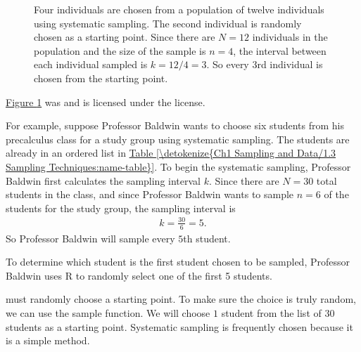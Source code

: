 \documentclass[letterpaper,10pt,english]{jupyterBook}
\begin{document}
\begin{figure}[htbp]
\centering
\capstart

\noindent{}
\caption{Four individuals are chosen from a population of twelve individuals using systematic sampling. The second individual is randomly chosen as a starting point. Since there are \(N = 12\) individuals in the population and the size of the sample is \(n = 4\), the interval between each individual sampled is \(k = 12/4 = 3\). So every 3rd individual is chosen from the starting point.\sphinxfootnotemark[3]}\label{\detokenize{Ch1 Sampling and Data/1.3 Sampling Techniques:id5}}\end{figure}
%
\begin{footnotetext}[3]\sphinxAtStartFootnote
\hyperref[\detokenize{Ch1 Sampling and Data/1.3 Sampling Techniques:id5}]{Figure \ref{\detokenize{Ch1 Sampling and Data/1.3 Sampling Techniques:id5}}} was  and is licensed under the  license.
%
\end{footnotetext}\ignorespaces 
\sphinxAtStartPar
For example, suppose Professor Baldwin wants to choose six students from his precalculus class for a study group using systematic sampling. The students are already in an ordered list in \hyperref[\detokenize{Ch1 Sampling and Data/1.3 Sampling Techniques:name-table}]{Table \ref{\detokenize{Ch1 Sampling and Data/1.3 Sampling Techniques:name-table}}}. To begin the systematic sampling, Professor Baldwin first calculates the sampling interval \(k\). Since there are \(N = 30\) total students in the class, and since Professor Baldwin wants to sample \(n = 6\) of the students for the study group, the sampling interval is
\begin{equation*}
\begin{split} k = \frac{30}{6} = 5. \end{split}
\end{equation*}
\sphinxAtStartPar
So Professor Baldwin will sample every \(5\)th student.

\sphinxAtStartPar
To determine which student is the first student chosen to be sampled, Professor Baldwin uses R to randomly select one of the first 5 students.

\sphinxAtStartPar
must randomly choose a starting point. To make sure the choice is truly random, we can use the sample function. We will choose \(1\) student from the list of \(30\) students as a starting point. Systematic sampling is frequently chosen because it is a simple method.
\end{document}
